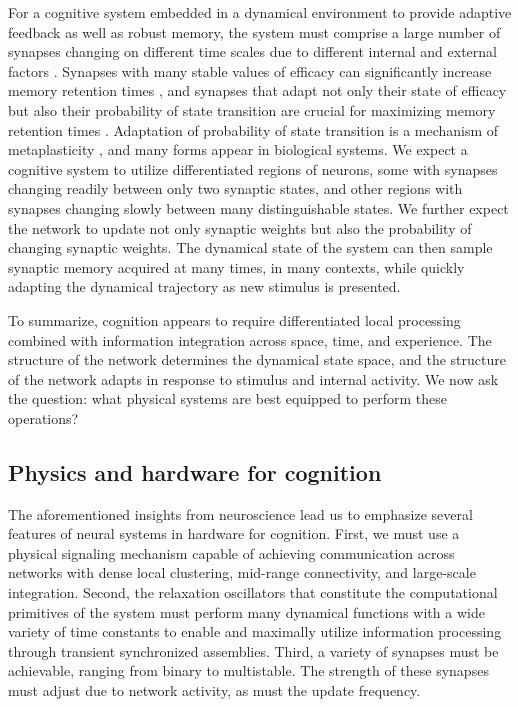 \documentclass[aip,amsmath,amssymb,reprint,nofootinbib]{revtex4-1}
\begin{document}
For a cognitive system embedded in a dynamical environment to provide adaptive feedback as well as robust memory, the system must comprise a large number of synapses changing on different time scales due to different internal and external factors \cite{fudr2005}. Synapses with many stable values of efficacy can significantly increase memory retention times \cite{fuab2007}, and synapses that adapt not only their state of efficacy but also their probability of state transition are crucial for maximizing memory retention times \cite{fudr2005,khso2017}. Adaptation of probability of state transition is a mechanism of metaplasticity \cite{ab2008}, and many forms appear in biological systems. We expect a cognitive system to utilize differentiated regions of neurons, some with synapses changing readily between only two synaptic states, and other regions with synapses changing slowly between many distinguishable states. We further expect the network to update not only synaptic weights but also the probability of changing synaptic weights. The dynamical state of the system can then sample synaptic memory acquired at many times, in many contexts, while quickly adapting the dynamical trajectory as new stimulus is presented.

To summarize, cognition appears to require differentiated local processing combined with information integration across space, time, and experience. The structure of the network determines the dynamical state space, and the structure of the network adapts in response to stimulus and internal activity. We now ask the question: what physical systems are best equipped to perform these operations?
	
\subsection{\label{sec:physicsAndHardware}Physics and hardware for cognition}
The aforementioned insights from neuroscience lead us to emphasize several features of neural systems in hardware for cognition. First, we must use a physical signaling mechanism capable of achieving communication across networks with dense local clustering, mid-range connectivity, and large-scale integration. Second, the relaxation oscillators that constitute the computational primitives of the system must perform many dynamical functions with a wide variety of time constants to enable and maximally utilize information processing through transient synchronized assemblies. Third, a variety of synapses must be achievable, ranging from binary to multistable. The strength of these synapses must adjust due to network activity, as must the update frequency.
\end{document}
